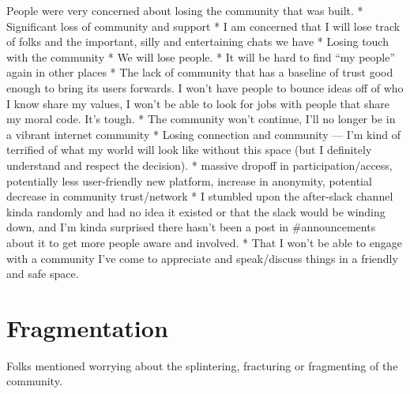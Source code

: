 \documentclass[
]{book}
\begin{document}
People were very concerned about losing the community that was built.
* Significant loss of community and support
* I am concerned that I will lose track of folks and the important, silly and entertaining chats we have
* Losing touch with the community
* We will lose people.
* It will be hard to find ``my people'' again in other places
* The lack of community that has a baseline of trust good enough to bring its users forwards. I won't have people to bounce ideas off of who I know share my values, I won't be able to look for jobs with people that share my moral code. It's tough.
* The community won't continue, I'll no longer be in a vibrant internet community
* Losing connection and community --- I'm kind of terrified of what my world will look like without this space (but I definitely understand and respect the decision).
* massive dropoff in participation/access, potentially less user-friendly new platform, increase in anonymity, potential decrease in community trust/network
* I stumbled upon the after-slack channel kinda randomly and had no idea it existed or that the slack would be winding down, and I'm kinda surprised there hasn't been a post in \#announcements about it to get more people aware and involved.
* That I won't be able to engage with a community I've come to appreciate and speak/discuss things in a friendly and safe space.

\section{Fragmentation}\label{fragmentation}

Folks mentioned worrying about the splintering, fracturing or fragmenting of the community.
\end{document}
